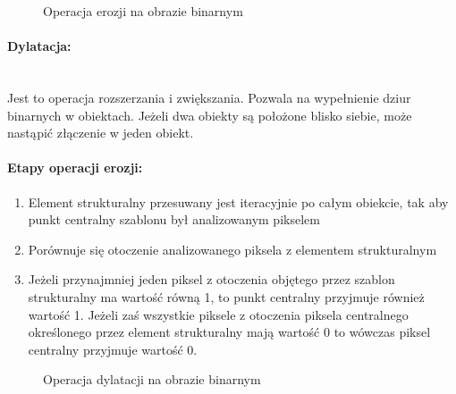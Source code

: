 \documentclass[a4paper,12pt,twoside,openany]{report}
\newcommand{\ImgPath}{.}
\begin{document}
\begin{figure}[H]
	\centering
	\caption{Operacja erozji na obrazie binarnym}
\end{figure}

\paragraph{Dylatacja:}\mbox{} \\
Jest to operacja rozszerzania i zwiększania. Pozwala na wypełnienie dziur binarnych w obiektach. Jeżeli dwa obiekty są położone blisko siebie, może nastąpić złączenie w jeden obiekt.

\paragraph{Etapy operacji erozji:}
\begin{enumerate}
	\item Element strukturalny przesuwany jest iteracyjnie po całym obiekcie, tak aby punkt centralny szablonu był analizowanym pikselem
	\item Porównuje się otoczenie analizowanego piksela z elementem strukturalnym
	\item Jeżeli przynajmniej jeden piksel z otoczenia objętego przez szablon strukturalny ma wartość równą 1, to punkt centralny przyjmuje również wartość 1. Jeżeli zaś wszystkie piksele z otoczenia piksela centralnego określonego przez element strukturalny mają wartość 0 to wówczas piksel centralny przyjmuje wartość 0.
\end{enumerate}

\begin{figure}[H]
	\centering
	\caption{Operacja dylatacji na obrazie binarnym}
\end{figure}
\end{document}
